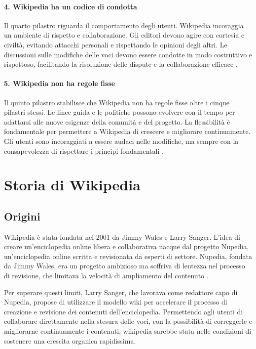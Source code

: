\documentclass[12pt,a4paper]{report}
\begin{document}
\paragraph*{4. Wikipedia ha un codice di condotta}
Il quarto pilastro riguarda il comportamento degli utenti. Wikipedia incoraggia un ambiente di rispetto e collaborazione. Gli editori devono agire con cortesia e civiltà, evitando attacchi personali e rispettando le opinioni degli altri. Le discussioni sulle modifiche delle voci devono essere condotte in modo costruttivo e rispettoso, facilitando la risoluzione delle dispute e la collaborazione efficace \cite{history_of_wikis}.

\paragraph*{5. Wikipedia non ha regole fisse}
Il quinto pilastro stabilisce che Wikipedia non ha regole fisse oltre i cinque pilastri stessi. Le linee guida e le politiche possono evolvere con il tempo per adattarsi alle nuove esigenze della comunità e del progetto. La flessibilità è fondamentale per permettere a Wikipedia di crescere e migliorare continuamente. Gli utenti sono incoraggiati a essere audaci nelle modifiche, ma sempre con la consapevolezza di rispettare i principi fondamentali \cite{reagle2010good}.

\section{Storia di Wikipedia}

\subsection{Origini}

Wikipedia è stata fondata nel 2001 da Jimmy Wales e Larry Sanger. L'idea di creare un'enciclopedia online libera e collaborativa nacque dal progetto Nupedia, un'enciclopedia online scritta e revisionata da esperti di settore. Nupedia, fondata da Jimmy Wales, era un progetto ambizioso ma soffriva di lentezza nel processo di revisione, che limitava la velocità di ampliamento del contenuto \cite{lih2009wikipedia}.

Per superare questi limiti, Larry Sanger, che lavorava come redattore capo di Nupedia, propose di utilizzare il modello wiki per accelerare il processo di creazione e revisione dei contenuti dell'enciclopedia. Permettendo agli utenti di collaborare direttamente nella stesura delle voci, con la possibilità di correggerle e migliorarne continuamente i contenuti, wikipedia sarebbe stata nelle condizioni di sostenere una crescita organica rapidissima\cite{reagle2010good}.
\end{document}
